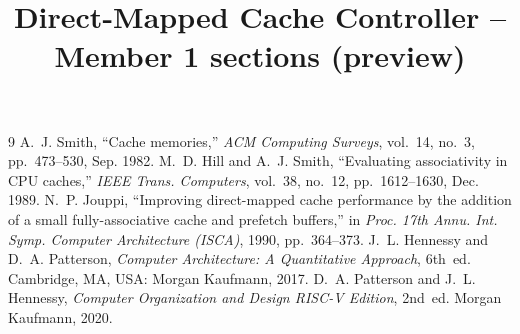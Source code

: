 \documentclass[conference]{IEEEtran}
\begin{document}
\title{Direct-Mapped Cache Controller -- Member 1 sections (preview)}
\maketitle

\begin{thebibliography}{9}
 A.~J. Smith, ``Cache memories,'' \emph{ACM Computing Surveys}, vol.~14, no.~3, pp.~473--530, Sep. 1982.
 M.~D. Hill and A.~J. Smith, ``Evaluating associativity in CPU caches,'' \emph{IEEE Trans. Computers}, vol.~38, no.~12, pp.~1612--1630, Dec. 1989.
 N.~P. Jouppi, ``Improving direct-mapped cache performance by the addition of a small fully-associative cache and prefetch buffers,'' in \emph{Proc. 17th Annu. Int. Symp. Computer Architecture (ISCA)}, 1990, pp.~364--373.
 J.~L. Hennessy and D.~A. Patterson, \emph{Computer Architecture: A Quantitative Approach}, 6th~ed. Cambridge, MA, USA: Morgan Kaufmann, 2017.
 D.~A. Patterson and J.~L. Hennessy, \emph{Computer Organization and Design RISC-V Edition}, 2nd~ed. Morgan Kaufmann, 2020.
\end{thebibliography}
\end{document}
